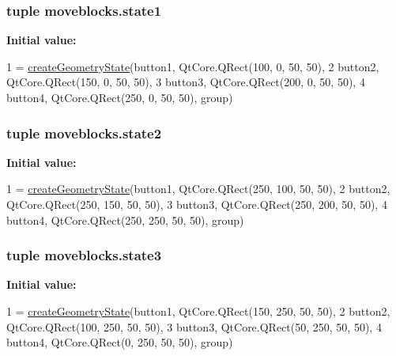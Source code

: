 \subsubsection[{state1}]{\setlength{\rightskip}{0pt plus 5cm}tuple moveblocks.\+state1}\label{namespacemoveblocks_a8e1c834a71ba9250191429d31540ef86}
{\bfseries Initial value\+:}
\begin{DoxyCode}
1 = \hyperlink{namespacemoveblocks_a0ad74b53c498f8dd97b3a612778b8661}{createGeometryState}(button1, QtCore.QRect(100, 0, 50, 50),
2             button2, QtCore.QRect(150, 0, 50, 50),
3             button3, QtCore.QRect(200, 0, 50, 50),
4             button4, QtCore.QRect(250, 0, 50, 50), group)
\end{DoxyCode}
\hypertarget{namespacemoveblocks_a922d3af2873d6ad9a2850cd45590299f}{}
\subsubsection[{state2}]{\setlength{\rightskip}{0pt plus 5cm}tuple moveblocks.\+state2}\label{namespacemoveblocks_a922d3af2873d6ad9a2850cd45590299f}
{\bfseries Initial value\+:}
\begin{DoxyCode}
1 = \hyperlink{namespacemoveblocks_a0ad74b53c498f8dd97b3a612778b8661}{createGeometryState}(button1, QtCore.QRect(250, 100, 50, 50),
2             button2, QtCore.QRect(250, 150, 50, 50),
3             button3, QtCore.QRect(250, 200, 50, 50),
4             button4, QtCore.QRect(250, 250, 50, 50), group)
\end{DoxyCode}
\hypertarget{namespacemoveblocks_a793c11cd3dec7747587440e41272ca5e}{}
\subsubsection[{state3}]{\setlength{\rightskip}{0pt plus 5cm}tuple moveblocks.\+state3}\label{namespacemoveblocks_a793c11cd3dec7747587440e41272ca5e}
{\bfseries Initial value\+:}
\begin{DoxyCode}
1 = \hyperlink{namespacemoveblocks_a0ad74b53c498f8dd97b3a612778b8661}{createGeometryState}(button1, QtCore.QRect(150, 250, 50, 50),
2             button2, QtCore.QRect(100, 250, 50, 50),
3             button3, QtCore.QRect(50, 250, 50, 50),
4             button4, QtCore.QRect(0, 250, 50, 50), group)
\end{DoxyCode}
\hypertarget{namespacemoveblocks_ad8534e18a69faf0a521009c595d5516d}{}
